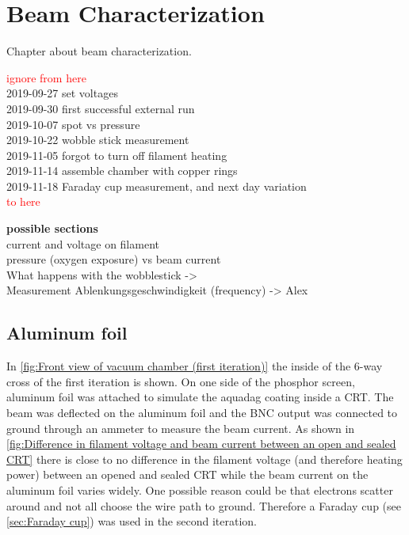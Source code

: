 
\chapter{Beam Characterization}
\label{ch:Beam Characterization}

Chapter about beam characterization.

\noindent \textcolor{red}{ignore from here} \\
2019-09-27 set voltages \\
2019-09-30 first successful external run \\
2019-10-07 spot vs pressure \\
2019-10-22 wobble stick measurement \\
2019-11-05 forgot to turn off filament heating \\
2019-11-14 assemble chamber with copper rings \\
2019-11-18 Faraday cup measurement, and next day variation \\
\textcolor{red}{to here}

\noindent \textbf{possible sections} \\
current and voltage on filament \\
pressure (oxygen exposure) vs beam current \\
What happens with the wobblestick ->  \\
Measurement Ablenkungsgeschwindigkeit (frequency) -> Alex \\


\section{Aluminum foil}
\label{sec:Aluminum foil}

In \cref{fig:Front view of vacuum chamber (first iteration)} the inside of the 6-way cross of the first iteration is shown. On one side of the phosphor screen, aluminum foil was attached to simulate the aquadag coating inside a CRT. The beam was deflected on the aluminum foil and the BNC output was connected to ground through an ammeter to measure the beam current. As shown in \cref{fig:Difference in filament voltage and beam current between an open and sealed CRT} there is close to no difference in the filament voltage (and therefore heating power) between an opened and sealed CRT while the beam current on the aluminum foil varies widely. One possible reason could be that electrons scatter around and not all choose the wire path to ground. Therefore a Faraday cup (see \cref{sec:Faraday cup}) was used in the second iteration.



